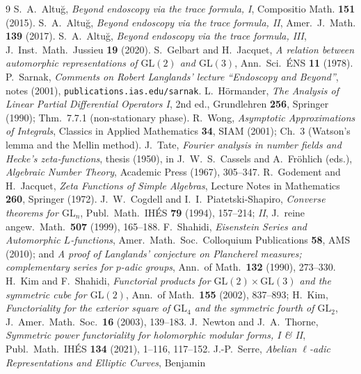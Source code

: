 \documentclass[11pt]{article}
\theoremstyle{definition}
\begin{document}
\begin{thebibliography}{9}
 S.~A.~Altu\u{g}, \emph{Beyond endoscopy via the trace formula, I}, Compositio Math.
\textbf{151} (2015).
 S.~A.~Altu\u{g}, \emph{Beyond endoscopy via the trace formula, II}, Amer.\ J.\ Math.
\textbf{139} (2017).
 S.~A.~Altu\u{g}, \emph{Beyond endoscopy via the trace formula, III}, J.\ Inst.\
Math.\ Jussieu \textbf{19} (2020).
 S.~Gelbart and H.~Jacquet, \emph{A relation between automorphic representations of
$\mathrm{GL}(2)$ and $\mathrm{GL}(3)$}, Ann.\ Sci.\ \'ENS \textbf{11} (1978).
\bibitem{Sar} P.~Sarnak, \emph{Comments on Robert Langlands' lecture ``Endoscopy and Beyond''}, notes
(2001), \texttt{publications.ias.edu/sarnak}.
 L.~H\"ormander, \emph{The Analysis of Linear Partial Differential Operators I},
2nd ed., Grundlehren \textbf{256}, Springer (1990); Thm.~7.7.1 (non-stationary phase).
\bibitem{Wong} R.~Wong, \emph{Asymptotic Approximations of Integrals}, Classics in Applied
Mathematics \textbf{34}, SIAM (2001); Ch.~3 (Watson's lemma and the Mellin method).
\bibitem{Tate} J.~Tate, \emph{Fourier analysis in number fields and Hecke's zeta-functions}, thesis
(1950), in J.~W.~S.~Cassels and A.~Fr\"ohlich (eds.), \emph{Algebraic Number Theory}, Academic Press
(1967), 305--347.
 R.~Godement and H.~Jacquet, \emph{Zeta Functions of Simple Algebras}, Lecture Notes in
Mathematics \textbf{260}, Springer (1972).
 J.~W.~Cogdell and I.~I.~Piatetski-Shapiro, \emph{Converse theorems for
$\mathrm{GL}_n$}, Publ.\ Math.\ IH\'ES \textbf{79} (1994), 157--214; \emph{II}, J.\ reine angew.\
Math.\ \textbf{507} (1999), 165--188.
\bibitem{Shahidi} F.~Shahidi, \emph{Eisenstein Series and Automorphic $L$-functions}, Amer.\ Math.\
Soc.\ Colloquium Publications \textbf{58}, AMS (2010); and \emph{A proof of Langlands' conjecture on
Plancherel measures; complementary series for $p$-adic groups}, Ann.\ of Math.\ \textbf{132} (1990),
273--330.
\bibitem{KimShahidi} H.~Kim and F.~Shahidi, \emph{Functorial products for
$\mathrm{GL}(2)\times\mathrm{GL}(3)$ and the symmetric cube for $\mathrm{GL}(2)$}, Ann.\ of Math.\
\textbf{155} (2002), 837--893; H.~Kim, \emph{Functoriality for the exterior square of
$\mathrm{GL}_4$ and the symmetric fourth of $\mathrm{GL}_2$}, J.\ Amer.\ Math.\ Soc.\ \textbf{16}
(2003), 139--183.
\bibitem{NT} J.~Newton and J.~A.~Thorne, \emph{Symmetric power functoriality for holomorphic modular
forms, I \& II}, Publ.\ Math.\ IH\'ES \textbf{134} (2021), 1--116, 117--152.
\bibitem{Serre} J.-P.~Serre, \emph{Abelian $\ell$-adic Representations and Elliptic Curves}, Benjamin

\end{thebibliography}
\end{document}
